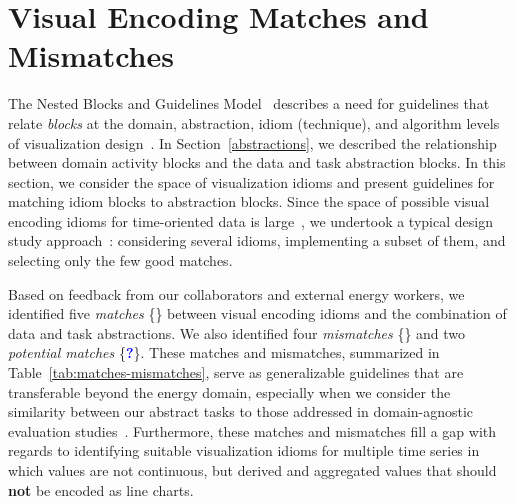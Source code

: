\documentclass[journal]{vgtc}                %
\newcommand*\match{\textcolor{darkGreen}{\ding{52}}}
\newcommand*\mismatch{\textcolor{red}{\ding{54}}}
\newcommand*\posmatch{\textcolor{blue}{{\bf ?}}}
\newcommand{\tm}[1]{\textcolor{red}{#1}}
\begin{document}
\section{Visual Encoding Matches and Mismatches}
\label{design:visenc}


The Nested Blocks and Guidelines Model~\cite{Meyer2013} describes a need for guidelines that relate {\it blocks} at the domain, abstraction, idiom (technique), and algorithm levels of visualization design~\cite{Munzner2009,Munzner2014}.
In Section~\ref{abstractions}, we described the relationship between domain activity blocks and the data and task abstraction blocks.
In this section, we consider the space of visualization idioms and present guidelines for matching idiom blocks to abstraction blocks. 
Since the space of possible visual encoding idioms for time-oriented data is large~\cite{Aigner2011}, we undertook a typical design study approach~\cite{Sedlmair2012}: considering several idioms, implementing a subset of them, and selecting only the few good matches.

Based on feedback from our collaborators and external energy workers, we identified five {\it matches} \{\match\} between visual encoding idioms and the combination of data and task abstractions. 
We also identified four {\it mismatches} \{\mismatch\} and two {\it potential matches} \{\posmatch\}. 
These matches and mismatches, summarized in Table~\ref{tab:matches-mismatches}, serve as generalizable guidelines that are transferable beyond the energy domain, especially when we consider the similarity between our abstract tasks to those addressed in domain-agnostic evaluation studies~\cite{Albers2014,Javed2010}.
Furthermore, these matches and mismatches fill a gap with regards to identifying suitable visualization idioms for multiple time series in which values are not continuous, but derived and aggregated values that should {\bf not} be encoded as line charts.
\end{document}
